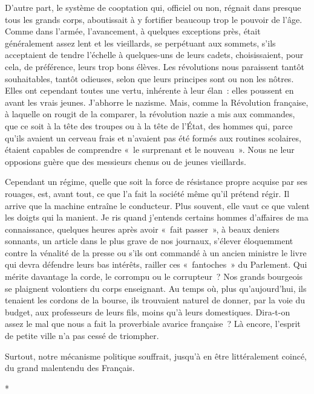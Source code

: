 \documentclass[french,twoside]{book} %
\begin{document}
D’autre part, le système de cooptation qui,   officiel ou non, régnait dans presque tous les grands corps, aboutissait à y fortifier beaucoup trop le pouvoir de l’âge. Comme dans l’armée, l’avancement, à quelques exceptions près, était généralement assez lent et les vieillards, se perpétuant aux sommets, s’ils acceptaient de tendre l’échelle à quelques-uns de leurs cadets, choisissaient, pour cela, de préférence, leurs trop bons élèves. Les révolutions nous paraissent tantôt souhaitables, tantôt odieuses, selon que leurs principes sont ou non les nôtres. Elles ont cependant toutes une vertu, inhérente à leur élan : elles poussent en avant les vrais jeunes. J’abhorre le nazisme. Mais, comme la Révolution française, à laquelle on rougit de la comparer, la révolution nazie a mis aux commandes, que ce soit à la tête des troupes ou à la tête de l’État, des hommes qui, parce qu’ils avaient un cerveau frais et n’avaient pas été formés aux routines scolaires, étaient capables de comprendre « le surprenant et le nouveau ». Nous ne leur opposions guère que des messieurs chenus ou de jeunes vieillards.\par
Cependant un régime, quelle que soit la force de résistance propre acquise par ses rouages, est, avant tout, ce que l’a fait la société même qu’il prétend régir. Il arrive que la machine entraîne le conducteur. Plus souvent, elle vaut ce que valent les doigts qui la manient. Je ris quand j’entends certains hommes d’affaires de ma connaissance, quelques heures après avoir « fait passer », à beaux deniers sonnants, un article dans le plus grave de nos journaux, s’élever éloquemment contre la vénalité de la presse ou s’ils ont commandé à un ancien ministre le livre qui devra défendre leurs bas intérêts, railler ces « fantoches » du Parlement. Qui mérite davantage la corde, le corrompu ou le corrupteur ? Nos grands bourgeois se plaignent volontiers du corps enseignant. Au temps où, plus qu’aujourd’hui, ils tenaient les cordons de la bourse, ils trouvaient naturel de donner, par la voie du budget, aux professeurs de   leurs fils, moins qu’à leurs domestiques. Dira-t-on assez le mal que nous a fait la proverbiale avarice française ? Là encore, l’esprit de petite ville n’a pas cessé de triompher.\par
Surtout, notre mécanisme politique souffrait, jusqu’à en être littéralement coincé, du grand malentendu des Français.\par

\begin{center}
\noindent \centerline{*}\par
\end{center}
\end{document}
